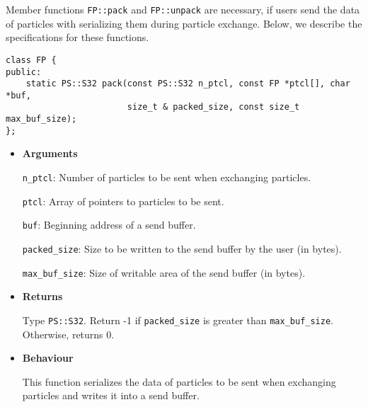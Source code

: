 
\label{sec:FP:serialize}

Member functions \texttt{FP::pack} and \texttt{FP::unpack} are necessary, if users send the data of particles with serializing them during particle exchange. Below, we describe the specifications for these functions.



\begin{screen}
\begin{verbatim}
class FP {
public:
    static PS::S32 pack(const PS::S32 n_ptcl, const FP *ptcl[], char *buf, 
                        size_t & packed_size, const size_t max_buf_size);
};
\end{verbatim}
\end{screen}

\begin{itemize}

\item {\bf Arguments}

  \texttt{n\_ptcl}: Number of particles to be sent when exchanging particles. 
  
  \texttt{ptcl}: Array of pointers to particles to be sent.
  
  \texttt{buf}: Beginning address of a send buffer. 
  
  \texttt{packed\_size}: Size to be written to the send buffer by the user (in bytes). 
  
  \texttt{max\_buf\_size}: Size of writable area of the send buffer (in bytes).

\item {\bf Returns}

  Type \texttt{PS::S32}. Return -1 if \texttt{packed\_size} is greater than \texttt{max\_buf\_size}. Otherwise, returns 0.
  
\item {\bf Behaviour}

This function serializes the data of particles to be sent when exchanging particles and writes it into a send buffer.

\end{itemize}


